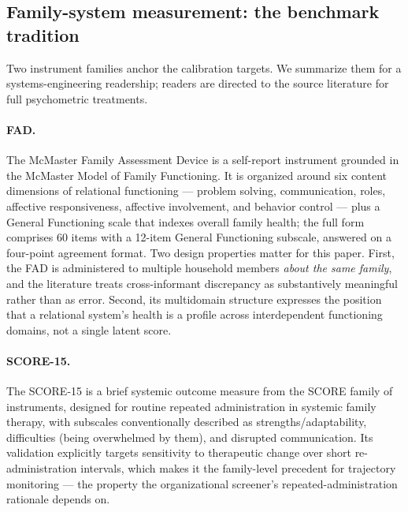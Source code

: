 \documentclass[12pt, letterpaper]{article}
\begin{document}
\subsection{Family-system measurement: the benchmark tradition}
\label{sec:familymeasurement}

Two instrument families anchor the calibration targets. We summarize them for a systems-engineering readership; readers are directed to the source literature for full psychometric treatments.

\paragraph{FAD.} The McMaster Family Assessment Device \parencite{epstein1983} is a self-report instrument grounded in the McMaster Model of Family Functioning. It is organized around six content dimensions of relational functioning --- problem solving, communication, roles, affective responsiveness, affective involvement, and behavior control --- plus a General Functioning scale that indexes overall family health; the full form comprises 60 items with a 12-item General Functioning subscale, answered on a four-point agreement format. Two design properties matter for this paper. First, the FAD is administered to multiple household members \emph{about the same family}, and the literature treats cross-informant discrepancy as substantively meaningful rather than as error. Second, its multidomain structure expresses the position that a relational system's health is a profile across interdependent functioning domains, not a single latent score.

\paragraph{SCORE-15.} The SCORE-15 \parencite{stratton2014} is a brief systemic outcome measure from the SCORE family of instruments, designed for routine repeated administration in systemic family therapy, with subscales conventionally described as strengths/adaptability, difficulties (being overwhelmed by them), and disrupted communication. Its validation explicitly targets sensitivity to therapeutic change over short re-administration intervals, which makes it the family-level precedent for trajectory monitoring --- the property the organizational screener's repeated-administration rationale depends on.
\end{document}
